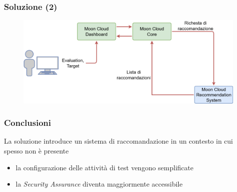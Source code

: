 \begin{frame}
    \frametitle{Soluzione (2)}
    \begin{figure}
        \centering
        \includegraphics[scale=0.34]{images/UML_MoonCloud_HowToDoPres}
    \end{figure}
\end{frame}

\begin{frame}
    \frametitle{Conclusioni}
    La soluzione introduce un sistema di raccomandazione in un contesto in cui spesso non è presente %
    \begin{itemize}
        \item la configurazione delle \alert{attività di test} vengono \alert{semplificate} 
        \item la \textit{Security Assurance} diventa maggiormente accessibile%
    \end{itemize}
\end{frame}
